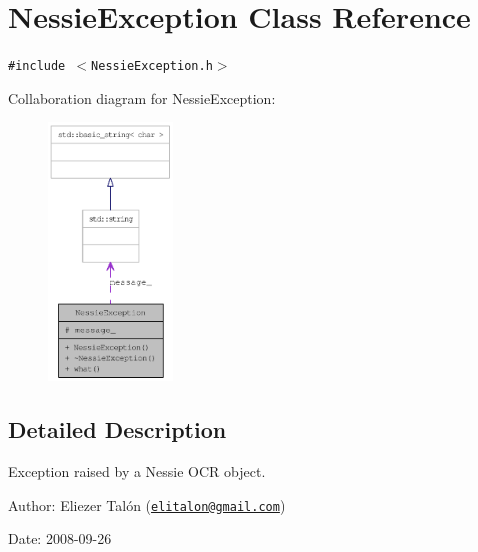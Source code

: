 \hypertarget{class_nessie_exception}{
\section{NessieException Class Reference}
\label{class_nessie_exception}
}
{\tt \#include $<$NessieException.h$>$}

Collaboration diagram for NessieException:\nopagebreak
\begin{figure}[H]
\begin{center}
\leavevmode
\includegraphics[width=94pt]{class_nessie_exception__coll__graph}
\end{center}
\end{figure}


\subsection{Detailed Description}
Exception raised by a Nessie OCR object. 

\begin{Desc}
\item[Author:]Eliezer Talón (\href{mailto:elitalon@gmail.com}{\tt elitalon@gmail.com}) \end{Desc}
\begin{Desc}
\item[Date:]2008-09-26 \end{Desc}


